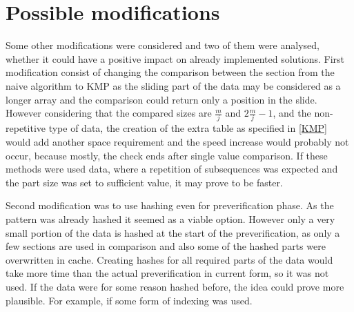 \section{Possible modifications}
Some other modifications were considered and two of them were analysed, whether it could have a positive impact on already implemented solutions. First modification consist of changing the comparison between the section from the naive algorithm to KMP as the sliding part of the data may be considered as a longer array and the comparison could return only a position in the slide. However considering that the compared sizes are $\frac{m}{j}$ and $2\frac{m}{j} - 1$, and the non-repetitive type of data, the creation of the extra table as specified in \ref{KMP} would add another space requirement and the speed increase would probably not occur, because mostly, the check ends after single value comparison. If these methods were used data, where a repetition of subsequences was expected and the part size was set to sufficient value, it may prove to be faster.

Second modification was to use hashing even for preverification phase. As the pattern was already hashed it seemed as a viable option. However only a very small portion of the data is hashed at the start of the preverification, as only a few sections are used in comparison and also some of the hashed parts were overwritten in cache. Creating hashes for all required parts of the data would take more time than the actual preverification in current form, so it was not used. If the data were for some reason hashed before, the idea could prove more plausible. For example, if some form of indexing was used.

